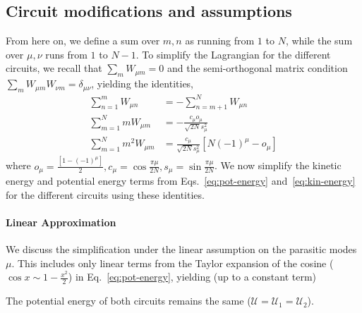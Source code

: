 \documentclass[%
reprint,
superscriptaddress,
 amsmath,amssymb,
 aps,
 prx,
longbibliography,
floatfix,
]{revtex4-2}
\begin{document}
\subsection{Circuit modifications and assumptions}
From here on, we define a sum over $m,n$ as running from $1$ to $N$, while the sum over $\mu,\nu$ runs from $1$ to $N-1$. To simplify the Lagrangian for the different circuits, we recall that $\sum_m W_{\mu m}=0$ and the semi-orthogonal matrix condition $\sum_m W_{\mu m}W_{\nu m}=\delta_{\mu\nu}$, yielding the identities,
\begin{align}
 \sum_{n=1}^m W_{\mu n}&=-\sum_{n=m+1}^N W_{\mu n}\\
 \sum_{m=1}^N mW_{\mu m}&=-\frac{c_\mu o_{\mu}}{\sqrt{2N}s_\mu^2}\\
 \sum_{m=1}^N m^2W_{\mu m}&=\frac{c_\mu}{\sqrt{2N}s_\mu^2}[N(-1)^\mu-o_\mu]
\end{align}
where $o_\mu=\frac{[1-(-1)^\mu]}{2}, c_\mu=\cos{\frac{\pi\mu}{2N}}, s_\mu=\sin{\frac{\pi\mu}{2N}}$. We now simplify the kinetic energy and potential energy terms from Eqs.~\ref{eq:pot-energy} and~\ref{eq:kin-energy} for the different circuits using these identities.\paragraph{Linear Approximation}
We discuss the simplification under the linear assumption on the parasitic modes $\mu$. This includes only linear terms from the Taylor expansion of the cosine ($\cos{x}\sim 1-\frac{x^2}{2}$) in Eq.~\ref{eq:pot-energy}, yielding (up to a constant term)

The potential energy of both circuits remains the same ($\mathcal{U}=\mathcal{U}_1=\mathcal{U}_2$).
\end{document}
